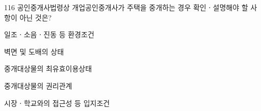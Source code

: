 \begin{question}{116}
공인중개사법령상 개업공인중개사가 주택을 중개하는 경우 확인ㆍ설명해야 할 사항이 아닌 것은?
\begin{choices}
  \item 일조ㆍ소음ㆍ진동 등 환경조건
  \item 벽면 및 도배의 상태
  \item 중개대상물의 최유효이용상태
  \item 중개대상물의 권리관계
  \item 시장ㆍ학교와의 접근성 등 입지조건
\end{choices}
\end{question}
